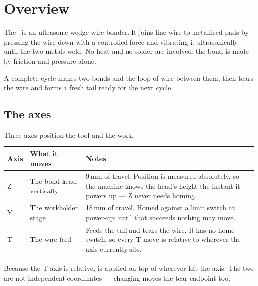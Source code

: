 \chapter{Overview}
\label{ch:overview}

The \productname\ is an ultrasonic wedge wire bonder. It joins fine wire to
metallised pads by pressing the wire down with a controlled force and vibrating
it ultrasonically until the two metals weld. No heat and no solder are
involved: the bond is made by friction and pressure alone.

A complete cycle makes two bonds and the loop of wire between them, then tears
the wire and forms a fresh tail ready for the next cycle.


\section{The axes}

Three axes position the tool and the work.

\begin{center}\small
\begin{tabular}{@{}L{16mm}L{34mm}L{72mm}@{}}
\toprule
\textbf{Axis} & \textbf{What it moves} & \textbf{Notes} \\
\midrule
Z & The bond head, vertically &
  9\,mm of travel. Position is measured absolutely, so the machine knows the
  head's height the instant it powers up --- Z never needs homing. \\
\addlinespace
Y & The workholder stage &
  18\,mm of travel. Homed against a limit switch at power-up; until that
  succeeds nothing may move. \\
\addlinespace
T & The wire feed &
  Feeds the tail and tears the wire. It has no home switch, so every T move is
  relative to wherever the axis currently sits. \\
\bottomrule
\end{tabular}
\end{center}

\begin{wbnote}
Because the T axis is relative,  is applied on top of wherever
 left the axis. The two are not independent coordinates ---
changing  moves the tear endpoint too.
\end{wbnote}

